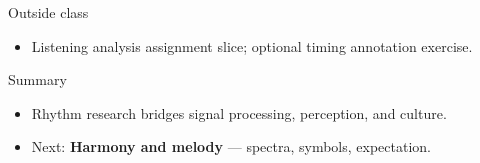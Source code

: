 \documentclass[aspectratio=169]{beamer}
\begin{document}
\begin{frame}{Outside class}
  \begin{itemize}
    \item Listening analysis assignment slice; optional timing annotation exercise.
  \end{itemize}
\end{frame}

\begin{frame}{Summary}
  \begin{itemize}
    \item Rhythm research bridges signal processing, perception, and culture.
    \item Next: \textbf{Harmony and melody} — spectra, symbols, expectation.
  \end{itemize}
\end{frame}
\end{document}

